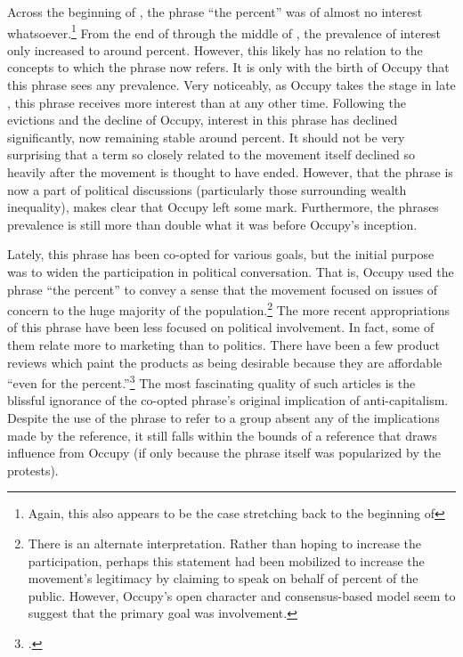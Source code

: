 \documentclass[openany,twoside]{memoir}
\begin{document}
\begin{Spacing}{2}
Across the beginning of , the phrase ``the  percent'' was of almost no interest whatsoever.\footnote{
Again, this also appears to be the case stretching back to the beginning of }
From the end of  through the middle of , the prevalence of interest only increased to around  percent.
However, this likely has no relation to the concepts to which the phrase now refers.
It is only with the birth of Occupy that this phrase sees any prevalence.
Very noticeably, as Occupy takes the stage in late , this phrase receives more interest than at any other time.
Following the evictions and the decline of Occupy, interest in this phrase has declined significantly, now remaining stable around  percent.
It should not be very surprising that a term so closely related to the movement itself declined so heavily after the movement is thought to have ended.
However, that the phrase is now a part of political discussions (particularly those surrounding wealth inequality), makes clear that Occupy left some mark.
Furthermore, the phrases prevalence is still more than double what it was before Occupy's inception.

Lately, this phrase has been co-opted for various goals, but the initial purpose was to widen the participation in political conversation.
That is, Occupy used the phrase ``the  percent'' to convey a sense that the movement focused on issues of concern to the huge majority of the population.\footnote{
There is an alternate interpretation.
Rather than hoping to increase the participation, perhaps this statement had been mobilized to increase the movement's legitimacy by claiming to speak on behalf of  percent of the public.
However, Occupy's open character and consensus-based model seem to suggest that the primary goal was involvement.}
The more recent appropriations of this phrase have been less focused on political involvement.
In fact, some of them relate more to marketing than to politics.
There have been a few product reviews which paint the products as being desirable because they are affordable ``even for the  percent.''\footcite{khaw12}
The most fascinating quality of such articles is the blissful ignorance of the co-opted phrase's original implication of anti-capitalism.
Despite the use of the phrase to refer to a group absent any of the implications made by the reference, it still falls within the bounds of a reference that draws influence from Occupy (if only because the phrase itself was popularized by the protests).


\end{Spacing}
\end{document}
